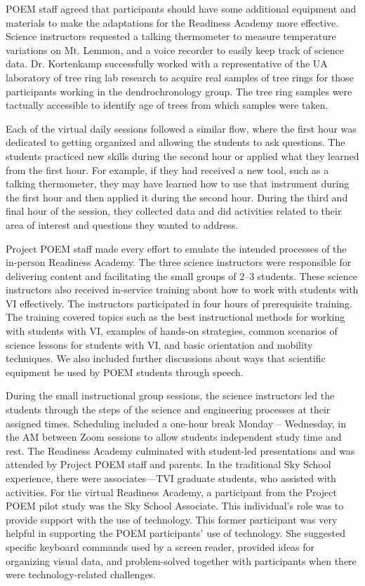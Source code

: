 \documentclass[11pt]{sig-alternate}
\begin{document}
\begin{large}
{POEM staff agreed that participants should have some additional equipment and materials to make the adaptations for the Readiness Academy more effective. Science instructors requested a talking thermometer to measure temperature variations on Mt. Lemmon, and a voice recorder to easily keep track of science data. Dr. Kortenkamp successfully worked with a representative of the UA laboratory of tree ring lab research to acquire real samples of tree rings for those participants working in the dendrochronology group. The tree ring samples were tactually accessible to identify age of trees from which samples were taken.

Each of the virtual daily sessions followed a similar flow, where the first hour was dedicated to getting organized and allowing the students to ask questions. The students practiced new skills during the second hour or applied what they learned from the first hour. For example, if they had received a new tool, such as a talking thermometer, they may have learned how to use that instrument during the first hour and then applied it during the second hour. During the third and final hour of the session, they collected data and did activities related to their area of interest and questions they wanted to address.

 Project POEM staff made every effort to emulate the intended processes of the in-person Readiness Academy. The three science instructors were responsible for delivering content and facilitating the small groups of 2–3 students. These science instructors also received in-service training about how to work with students with VI effectively. The instructors participated in four hours of prerequisite training. The training covered topics such as the best instructional methods for working with students with VI, examples of hands-on strategies, common scenarios of science lessons for students with VI, and basic orientation and mobility techniques. We also included further discussions about ways that scientific equipment be used by POEM students through speech.
 
During the small instructional group sessions, the science instructors led the students through the steps of the science and engineering processes at their assigned times. Scheduling included a one-hour break Monday – Wednesday, in the AM between Zoom sessions to allow students independent study time and rest. The Readiness Academy culminated with student-led presentations and was attended by Project POEM staff and parents. In the traditional Sky School experience, there were associates—TVI graduate students, who assisted with activities. For the virtual Readiness Academy, a participant from the Project POEM pilot study was the Sky School Associate. This individual’s role was to provide support with the use of technology. This former participant was very helpful in supporting the POEM participants’ use of technology. She suggested specific keyboard commands used by a screen reader, provided ideas for organizing visual data, and problem-solved together with participants when there were technology-related challenges.

}
\end{large}
\end{document}
